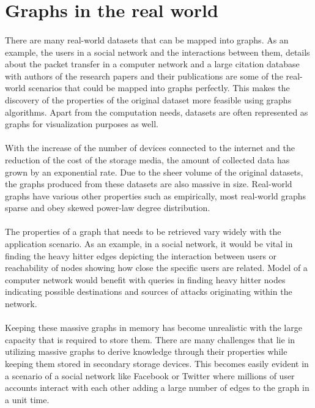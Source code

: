 \section{Graphs in the real world}

\paragraph{}
There are many real-world datasets that can be mapped into graphs. As an example, the users in a social network and the interactions between them\cite{mishra_modelling_2014}, details about the packet transfer in a computer network\cite{ahmat_graph_nodate} and a large citation database with authors of the research papers and their publications\cite{cui_citation_nodate} are some of the real-world scenarios that could be mapped into graphs perfectly. This makes the discovery of the properties of the original dataset more feasible using graphs algorithms. Apart from the computation needs, datasets are often represented as graphs for visualization purposes as well\cite{wang_survey_2015}.

\paragraph{}
With the increase of the number of devices connected to the internet and the reduction of the cost of the storage media, the amount of collected data has grown by an exponential rate. Due to the sheer volume of the original datasets, the graphs produced from these datasets are also massive in size. Real-world graphs have various other properties such as empirically, most real-world graphs sparse and obey skewed power-law degree distribution\cite{xie_distributed_2014}.

\paragraph{}
The properties of a graph that needs to be retrieved vary widely with the application scenario. As an example, in a social network, it would be vital in finding the heavy hitter edges depicting the interaction between users or reachability of nodes showing how close the specific users are related. Model of a computer network would benefit with queries in finding heavy hitter nodes indicating possible destinations and sources of attacks originating within the network.

\paragraph{}
Keeping these massive graphs in memory has become unrealistic with the large capacity that is required to store them. There are many challenges that lie in utilizing massive graphs to derive knowledge through their properties while keeping them stored in secondary storage devices. This becomes easily evident in a scenario of a social network like Facebook\cite{ching_one_2015} or Twitter\cite{kwak_what_2010} where millions of user accounts interact with each other adding a large number of edges to the graph in a unit time.

